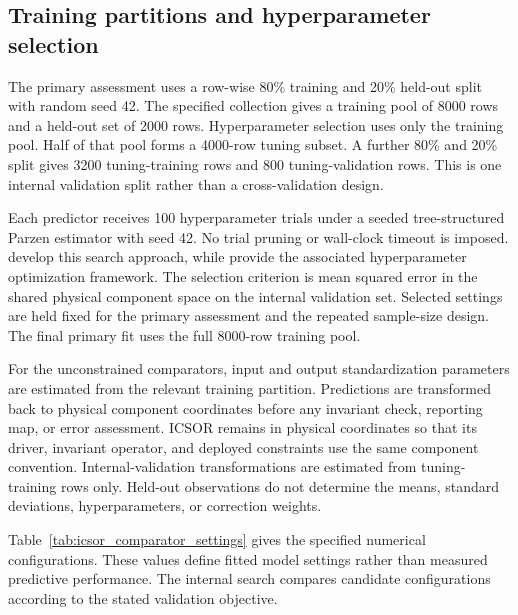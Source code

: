 \subsection{Training partitions and hyperparameter selection}

The primary assessment uses a row-wise 80\% training and 20\% held-out split with random seed 42. The specified collection gives a training pool of 8000 rows and a held-out set of 2000 rows. Hyperparameter selection uses only the training pool. Half of that pool forms a 4000-row tuning subset. A further 80\% and 20\% split gives 3200 tuning-training rows and 800 tuning-validation rows. This is one internal validation split rather than a cross-validation design.

Each predictor receives 100 hyperparameter trials under a seeded tree-structured Parzen estimator with seed 42. No trial pruning or wall-clock timeout is imposed. \citet{Bergstra2011} develop this search approach, while \citet{Akiba2019} provide the associated hyperparameter optimization framework. The selection criterion is mean squared error in the shared physical component space on the internal validation set. Selected settings are held fixed for the primary assessment and the repeated sample-size design. The final primary fit uses the full 8000-row training pool.

For the unconstrained comparators, input and output standardization parameters are estimated from the relevant training partition. Predictions are transformed back to physical component coordinates before any invariant check, reporting map, or error assessment. ICSOR remains in physical coordinates so that its driver, invariant operator, and deployed constraints use the same component convention. Internal-validation transformations are estimated from tuning-training rows only. Held-out observations do not determine the means, standard deviations, hyperparameters, or correction weights.

Table~\ref{tab:icsor_comparator_settings} gives the specified numerical configurations. These values define fitted model settings rather than measured predictive performance. The internal search compares candidate configurations according to the stated validation objective.

